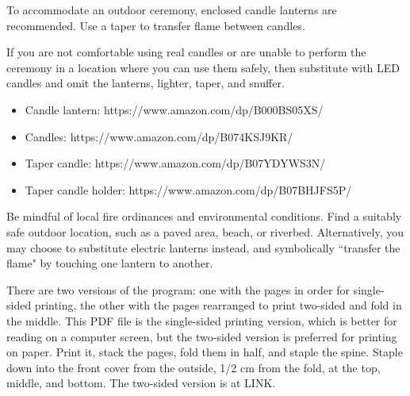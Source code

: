 \documentclass{article}
\begin{document}
To accommodate an outdoor ceremony, enclosed candle lanterns are recommended.
Use a taper to transfer flame between candles.

If you are not comfortable using real candles or are unable to perform the
ceremony in a location where you can use them safely, then substitute with LED
candles and omit the lanterns, lighter, taper, and snuffer.

\begin{itemize} \itemsep0pt \parskip0pt 
	\item Candle lantern: https://www.amazon.com/dp/B000BS05XS/
	\item Candles: https://www.amazon.com/dp/B074KSJ9KR/
	\item Taper candle: https://www.amazon.com/dp/B07YDYWS3N/
	\item Taper candle holder: https://www.amazon.com/dp/B07BHJFS5P/
\end{itemize}

Be mindful of local fire ordinances and environmental conditions. Find a
suitably safe outdoor location, such as a paved area, beach, or riverbed.
Alternatively, you may choose to substitute electric lanterns instead, and
symbolically ``transfer the flame" by touching one lantern to another.

There are two versions of the program: one with the pages in order for
single-sided printing, the other with the pages rearranged to print two-sided
and fold in the middle. This PDF file is the single-sided printing version,
which is better for reading on a computer screen, but the two-sided version is
preferred for printing on paper. Print it, stack the pages, fold them in half,
and staple the spine. Staple down into the front cover from the outside, 1/2
cm from the fold, at the top, middle, and bottom. The two-sided version is at
LINK{}. %
\end{document}
